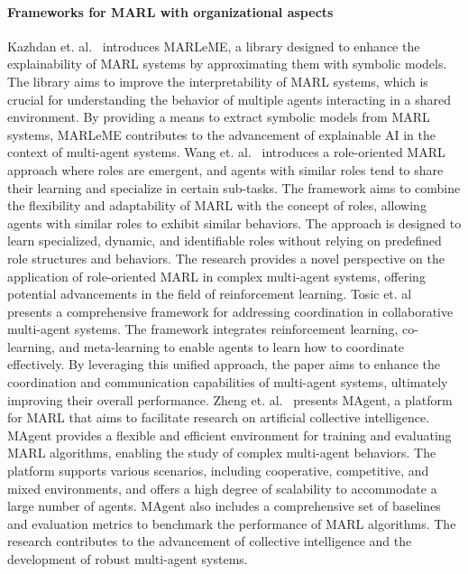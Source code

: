 \documentclass[runningheads]{llncs}
\begin{document}
\paragraph{\textbf{Frameworks for MARL with organizational aspects}}

Kazhdan et. al.~\cite{Kazhdan2020} introduces MARLeME, a library designed to enhance the explainability of MARL systems by approximating them with symbolic models. The library aims to improve the interpretability of MARL systems, which is crucial for understanding the behavior of multiple agents interacting in a shared environment. By providing a means to extract symbolic models from MARL systems, MARLeME contributes to the advancement of explainable AI in the context of multi-agent systems.
%
Wang et. al.~\cite{Wang2020} introduces a role-oriented MARL approach where roles are emergent, and agents with similar roles tend to share their learning and specialize in certain sub-tasks. The framework aims to combine the flexibility and adaptability of MARL with the concept of roles, allowing agents with similar roles to exhibit similar behaviors. The approach is designed to learn specialized, dynamic, and identifiable roles without relying on predefined role structures and behaviors. The research provides a novel perspective on the application of role-oriented MARL in complex multi-agent systems, offering potential advancements in the field of reinforcement learning.
%
Tosic et. al~\cite{Tosic2010} presents a comprehensive framework for addressing coordination in collaborative multi-agent systems. The framework integrates reinforcement learning, co-learning, and meta-learning to enable agents to learn how to coordinate effectively. By leveraging this unified approach, the paper aims to enhance the coordination and communication capabilities of multi-agent systems, ultimately improving their overall performance.
%
Zheng et. al.~\cite{Zheng2018} presents MAgent, a platform for MARL that aims to facilitate research on artificial collective intelligence. MAgent provides a flexible and efficient environment for training and evaluating MARL algorithms, enabling the study of complex multi-agent behaviors. The platform supports various scenarios, including cooperative, competitive, and mixed environments, and offers a high degree of scalability to accommodate a large number of agents. MAgent also includes a comprehensive set of baselines and evaluation metrics to benchmark the performance of MARL algorithms. The research contributes to the advancement of collective intelligence and the development of robust multi-agent systems.
\end{document}

